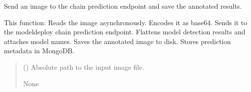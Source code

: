 \documentclass[letterpaper,10pt,english]{sphinxmanual}
\begin{document}

\begin{fulllineitems}
\label{\detokenize{modules/src.pig_sorting_api.main:src.pig_sorting_api.main.send_to_chain_prediction}}
\pysigstartsignatures
\pysiglinewithargsret
{}
{}
{}
\pysigstopsignatures
\sphinxAtStartPar
Send an image to the chain prediction endpoint and save the annotated results.

\sphinxAtStartPar
This function:
\sphinxhyphen{} Reads the image asynchronously.
\sphinxhyphen{} Encodes it as base64.
\sphinxhyphen{} Sends it to the model\sphinxhyphen{}deploy chain prediction endpoint.
\sphinxhyphen{} Flattens model detection results and attaches model names.
\sphinxhyphen{} Saves the annotated image to disk.
\sphinxhyphen{} Stores prediction metadata in MongoDB.
\begin{quote}\begin{description}
\sphinxAtStartPar
{} () \textendash{} Absolute path to the input image file.

\sphinxAtStartPar
None

\end{description}\end{quote}

\end{fulllineitems}

\end{document}
